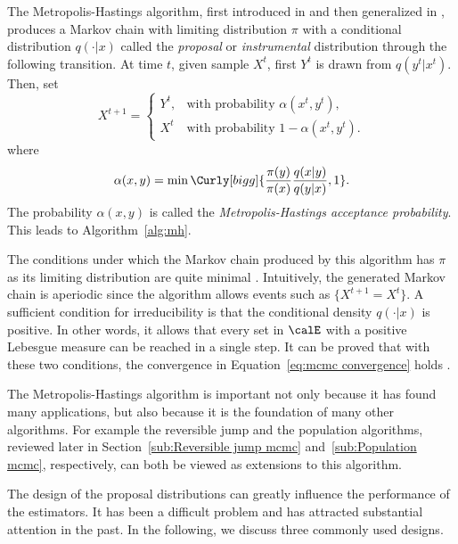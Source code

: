 The Metropolis-Hastings algorithm, first introduced in
\cite{Metropolis:1953ex} and then generalized in \cite{Hastings:1970gd},
produces a Markov chain with limiting distribution $\pi$ with a conditional
distribution $q(\cdot|x)$ called the \emph{proposal} or \emph{instrumental}
distribution through the following transition. At time $t$, given sample
$X^t$, first $Y^t$ is drawn from $q(y^t|x^t)$. Then, set
\begin{equation*}
  X^{t+1} =
  \begin{cases}
    Y^t, &\text{with probability } \alpha(x^t,y^t),\\
    X^t  &\text{with probability } 1 - \alpha(x^t,y^t).
  \end{cases}
\end{equation*}
where
\begin{equation}
  \alpha(x,y) =
  \min\Curly[bigg]{\frac{\pi(y)}{\pi(x)}\frac{q(x|y)}{q(y|x)},1}.
\end{equation}
The probability $\alpha(x,y)$ is called the \emph{Metropolis-Hastings
  acceptance probability}. This leads to Algorithm~\ref{alg:mh}.



The conditions under which the Markov chain produced by this algorithm has
$\pi$ as its limiting distribution are quite minimal
\cite[][sec.~7.3.2]{Robert:2004tn}. Intuitively, the generated Markov chain is
aperiodic since the algorithm allows events such as $\{X^{t+1} = X^t\}$. A
sufficient condition for irreducibility is that the conditional density
$q(\cdot|x)$ is positive. In other words, it allows that every set in $\calE$
with a positive Lebesgue measure can be reached in a single step. It can be
proved that with these two conditions, the convergence in
Equation~\eqref{eq:mcmc convergence} holds \cite[][Theorem~7.4 and
Corollary~7.5]{Robert:2004tn}.

The Metropolis-Hastings algorithm is important not only because it has found
many applications, but also because it is the foundation of many other
algorithms. For example the reversible jump \mcmc and the population \mcmc
algorithms, reviewed later in Section~\ref{sub:Reversible jump mcmc}
and~\ref{sub:Population mcmc}, respectively, can both be viewed as extensions
to this algorithm.

The design of the proposal distributions can greatly influence the performance
of the estimators. It has been a difficult problem and has attracted
substantial attention in the past. In the following, we discuss three commonly
used designs.


